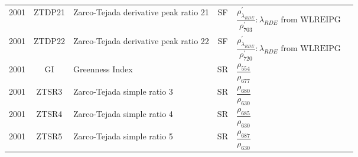 \documentclass[10pt]{article}
\begin{document}
\begin{ThreePartTable}
\begin{longtable}{c c m{2.3in} c M{2.8in} M{1.5in}}
  2001 & ZTDP21  & Zarco-Tejada derivative peak ratio 21                                          & SF & $\dfrac{\rho^\prime_{\lambda_{RDE}}}{\rho^\prime_{703}} : \lambda_{RDE} \text{ from WLREIPG}$                                                                                                                                                                                           & \citet{Zarco-Tejada2001b,Miller1990}                \\
  2001 & ZTDP22  & Zarco-Tejada derivative peak ratio 22                                          & SF & $\dfrac{\rho^\prime_{\lambda_{RDE}}}{\rho^\prime_{720}} : \lambda_{RDE} \text{ from WLREIPG}$                                                                                                                                                                                           & \citet{Zarco-Tejada2001b,Miller1990}                \\
  2001 & GI      & Greenness Index                                                                & SR & $\dfrac{\rho_{554}}{\rho_{677}}$                                                                                                                                                                                                                                                        & \citet{Zarco-Tejada2001b}                           \\
  2001 & ZTSR3   & Zarco-Tejada simple ratio 3                                                    & SR & $\dfrac{\rho_{680}}{\rho_{630}}$                                                                                                                                                                                                                                                        & \citet{Zarco-Tejada2001a}                           \\
  2001 & ZTSR4   & Zarco-Tejada simple ratio 4                                                    & SR & $\dfrac{\rho_{685}}{\rho_{630}}$                                                                                                                                                                                                                                                        & \citet{Zarco-Tejada2001a}                           \\
  2001 & ZTSR5   & Zarco-Tejada simple ratio 5                                                    & SR & $\dfrac{\rho_{687}}{\rho_{630}}$                                                                                                                                                                                                                                                        & \citet{Zarco-Tejada2001a}                           \\

\end{longtable}
\end{ThreePartTable}
\end{document}

